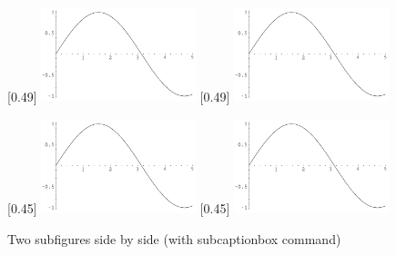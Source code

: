 \documentclass[English]{APSart}
\begin{document}
	\begin{figure}[htbp] %
		\centering
		[0.49\textwidth]
		{\includegraphics[width=0.4\textwidth]{figs/sin.pdf}}
		[0.49\textwidth]
		{\includegraphics[width=0.4\textwidth]{figs/sin.pdf}}
	\end{figure}

	
	\begin{figure}[htbp] %
		\centering
		[0.45\textwidth]
		{\includegraphics[width=0.4\textwidth]{figs/sin.pdf}}
		[0.45\textwidth]
		{\includegraphics[width=0.4\textwidth]{figs/sin.pdf}}
		\caption{Two subfigures side by side (with subcaptionbox command)}
		\label{mini:subfigs} %
	\end{figure}
	
\end{document}
